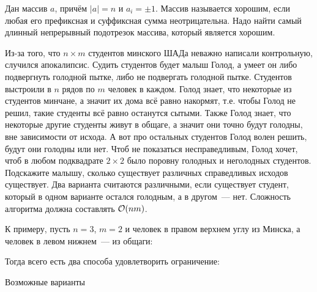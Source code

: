 \documentclass[addpoints]{exam}
\begin{document}
\begin{questions}
\question[1] Дан массив $a$, причём $|a|=n$ и $a_i=\pm 1$. Массив называется хорошим, если любая его префиксная и суффиксная сумма неотрицательна. Надо найти самый длинный непрерывный подотрезок массива, который является хорошим.

\question[1 \half] Из-за того, что $n \times m$ студентов минского ШАДа неважно написали контрольную, случился апокалипсис. Судить студентов будет малыш Голод, а умеет он либо подвергнуть голодной пытке, либо не подвергать голодной пытке. Студентов выстроили в $n$ рядов по $m$ человек в каждом. Голод знает, что некоторые из студентов минчане, а значит их дома всё равно накормят, т.е. чтобы Голод не решил, такие студенты всё равно останутся сытыми. Также Голод знает, что некоторые другие студенты живут в общаге, а значит они точно будут голодны, вне зависимости от исхода. А вот про остальных студентов Голод волен решить, будут они голодны или нет. Чтоб не показаться несправедливым, Голод хочет, чтоб в любом подквадрате $2 \times 2$ было поровну голодных и неголодных студентов. Подскажите малышу, сколько существует различных справедливых исходов существует. Два варианта считаются различными, если существует студент, который в одном варианте остался голодным, а в другом~--- нет. Сложность алгоритма должна составлять $\mathcal{O}(nm)$.

К примеру, пусть $n=3$, $m=2$ и человек в правом верхнем углу из Минска, а человек в левом нижнем~--- из общаги:

\begin{center}
\end{center}

Тогда всего есть два способа удовлетворить ограничение:

\begin{table}[H]
    \caption{Возможные варианты}
    \begin{minipage}{.5\linewidth}
      

\end{minipage}
\end{table}
\end{questions}
\end{document}
